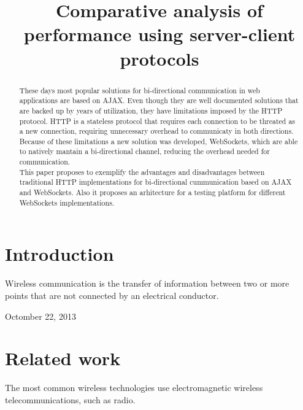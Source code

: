 \documentclass[conference]{IEEEtran}
\begin{document}
\title{Comparative analysis of performance using server-client protocols}

\author{
\and
{}
}

\maketitle

\begin{abstract}
These days most popular solutions for bi-directional communication in
web applications are based on AJAX.
Even though they are well documented solutions that are backed up by years of
utilization, they have limitations imposed by the HTTP protocol. HTTP is a
stateless protocol that requires each connection to be threated as a new
connection, requiring unnecessary overhead to communicaty in both directions.
Because of these limitations a new solution was developed, WebSockets,
which are able to natively mantain a bi-directional channel, reducing the
overhead needed for communication.
\\
\indent
This paper proposes to exemplify the advantages and disadvantages between
traditional HTTP implementations for bi-directional cummunication based on AJAX
and WebSockets. Also it proposes an arhitecture for a testing platform for
different WebSockets implementations.
\end{abstract}

\IEEEpeerreviewmaketitle

\section{Introduction}
Wireless communication is the transfer of information
between two or more points that are not connected
by an electrical conductor.
 
\hfill Octomber 22, 2013

\section{Related work}
The most common wireless technologies use electromagnetic
wireless telecommunications, such as radio. \cite{3}
\end{document}
